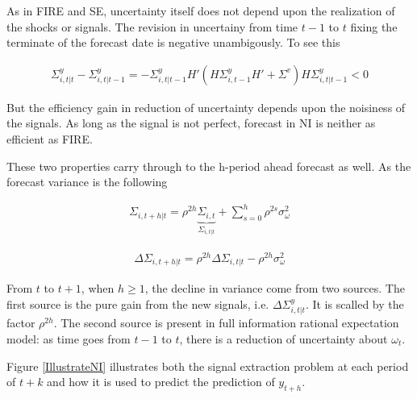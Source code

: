 \documentclass[]{article}
\begin{document}
As in FIRE and SE, uncertainty itself does not depend upon the realization of the shocks or signals. The revision in uncertainy from time $t-1$ to $t$ fixing the terminate of the forecast date is negative  unambigously. To see this 

\begin{eqnarray}
\Sigma^y_{i,t|t} - \Sigma^y_{i,t|t-1} = - \Sigma^y_{i,t|t-1} H'(H \Sigma^y_{i,t-1} H' +\Sigma^v) H \Sigma^y_{i,t|t-1} <0
\end{eqnarray}

But the efficiency gain in reduction of uncertainty depends upon the noisiness of the signals. As long as the signal is not perfect, forecast in NI is neither as efficient as FIRE. 

These two properties carry through to the h-period ahead forecast as well. As the forecast variance is the following 

\begin{eqnarray}
\Sigma_{i,t+h|t} = \rho^{2h} \underbrace{\Sigma_{i,t}}_{\Sigma_{i,t|t}} + \sum^{h}_{s=0}\rho^{2s} \sigma^2_{\omega}
\end{eqnarray}


\begin{eqnarray}
\Delta \Sigma_{i,t+h|t} = \rho^{2h}\Delta  \Sigma_{i,t|t}  - \rho^{2h} \sigma^2_{\omega}
\end{eqnarray}

From $t$ to $t+1$, when $h\geq 1$, the decline in variance come from two sources. The first source is the pure gain from the new signals, i.e. $\Delta \Sigma^y_{i,t|t}$. It is scalled by the factor $\rho^{2h}$. The second source is present in full information rational expectation model: as time goes from $t-1$ to $t$, there is a reduction of uncertainty about $\omega_t$.

Figure \ref{IllustrateNI} illustrates both the signal extraction problem at each period of $t+k$ and how it is used to predict the prediction of $y_{t+h}$. 
\end{document}
